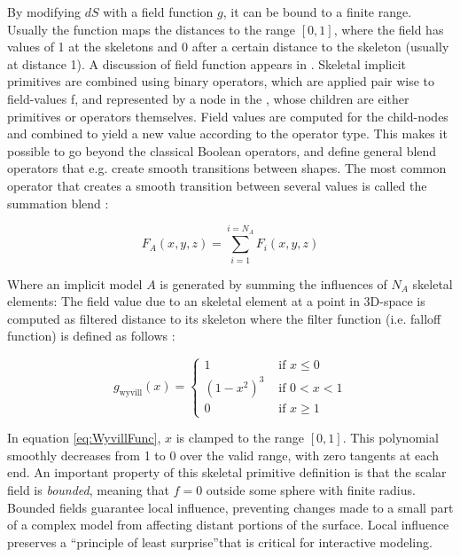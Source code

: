 By modifying $dS$ with a field function $g$, it can be bound to a finite range. Usually the function maps the distances to the range $[0, 1]$, 
where the field has values of 1 at the skeletons and 0 after a certain distance to the skeleton (usually at distance 1). A discussion of field 
function appears in \cite{shirley2009graphics}. Skeletal implicit primitives are combined using binary operators, which are applied pair wise to 
field-values f, and represented by a node in the \blob, whose children are either primitives or operators themselves.
Field values are computed for the child-nodes and combined to yield a new value according to the operator type. This makes it possible to go beyond 
the classical Boolean operators, and define general blend operators that e.g. create smooth transitions between shapes. The most common operator 
that creates a smooth transition between several values is called the summation blend \cite{Bloomenthal1997}:

\begin{equation}
F_A(x, y, z)=\sum_{i=1}^{i=N_A}F_i(x, y, z)
\end{equation}

Where an implicit model $A$ is generated by summing the influences of $N_A$ skeletal elements: 
The field value due to an skeletal element at a point in 3D-space is computed as filtered distance to its skeleton 
where the filter function (i.e. falloff function) is defined as follows \cite{Wyvill1999}: 

\begin{equation}
g_\mathrm{wyvill}(x)= \left\{ \begin{array}{rl}
 1 &\mbox{ if $x\leq0$} \\
 (1-x^2)^3 &\mbox{ if $0<x<1$}\\
  0 &\mbox{ if $x\geq1$}  
  \end{array} \right.
\label{eq:WyvillFunc}
\end{equation}

In equation \ref{eq:WyvillFunc}, $x$ is clamped to the range $[0,1]$. This polynomial smoothly decreases from 1 to 0 over the valid range, with zero
tangents at each end. An important property of this skeletal primitive definition is that the scalar field is \textit{bounded}, meaning that $f=0$
outside some sphere with finite radius. Bounded fields guarantee local influence, preventing changes made to a small part of a complex model from
affecting distant portions of the surface. Local influence preserves a \textquotedblleft principle of least surprise\textquotedblright that is critical 
for interactive modeling.  

